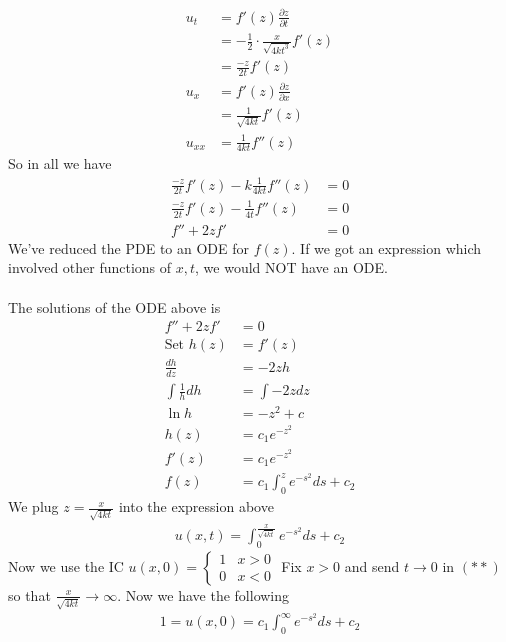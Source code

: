 \documentclass[12pt, letterpaper]{article}
\begin{document}
\begin{enumerate}
\begin{align*}
        u_t &= f'(z) \frac{\partial z }{\partial t} \\
        &= -\frac 12 \cdot \frac{x}{\sqrt{4kt^3}}f'(z) \\
        &= \frac{-z}{2t} f'(z) \\
        u_x &= f'(z) \frac{\partial z}{\partial x} \\
        &= \frac{1}{\sqrt{4kt}}f'(z) \\
        u_{xx} &= \frac{1}{4kt}f''(z)
    \end{align*}
    So in all we have 
    \begin{align*}
        \frac{-z}{2t} f'(z) - k\frac{1}{4kt}f''(z) &= 0 \\
    \frac{-z}{2t} f'(z) - \frac{1}{4t}f''(z) &= 0 \\
        f'' + 2zf' &= 0
    \end{align*}
    We've reduced the PDE to an ODE for $f(z)$. If we got an expression which involved other
    functions of $x,t$, we would NOT have an ODE. \\ \\ The solutions of the ODE above is
    \begin{align*}
        f'' + 2zf' &= 0 \\
        \text{Set }h(z) &= f'(z) \\
        \frac{dh}{dz} &= -2zh \\
        \int \frac 1h dh &= \int -2 zdz \\
        \ln h &= -z^2 + c \\
        h(z) &= c_1e^{-z^2} \\
        f'(z) &= c_1e^{-z^2} \\
        f(z) &= c_1 \int_{0}^{z}e^{-s^2}ds + c_2 
    \end{align*}
    We plug $z = \frac{x}{\sqrt{4kt}}$ into the expression above
    \begin{align*}
        u(x,t) = \int_{0}^{\frac{x}{\sqrt{4kt}}} e^{-s^2}ds + c_2 \tag{$\ast \ast$}
    \end{align*}
    Now we use the IC $u(x,0) = \begin{cases}
        1 & x > 0 \\
        0 & x < 0
    \end{cases}$
    Fix $x > 0$ and send $t \rightarrow 0$ in $(\ast \ast)$ so that 
    $\frac{x}{\sqrt{4kt}} \rightarrow \infty$. Now we have the following 
    \begin{align*}
        1 = u(x,0) = c_1 \int_{0}^{\infty} e^{-s^2} ds + c_2
    \end{align*}

\end{enumerate}
\end{document}
